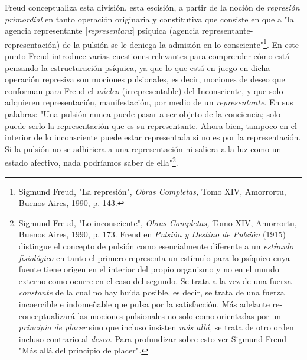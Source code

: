 Freud conceptualiza esta división, esta escisión, a partir de la noción
de \emph{represión primordial} en tanto operación originaria y
constitutiva que consiste en que a "la agencia representante
{[}\emph{representanz}{]} psíquica (agencia
representante-representación) de la pulsión se le deniega la admisión en
lo consciente"\footnote{Sigmund Freud, "La represión", \emph{Obras
  Completas,} Tomo XIV, Amorrortu, Buenos Aires, 1990, p. 143.}. En este
punto Freud introduce varias cuestiones relevantes para comprender cómo
está pensando la estructuración psíquica, ya que lo que está en juego en
dicha operación represiva son mociones pulsionales, es decir, mociones
de deseo que conforman para Freud el \emph{núcleo} (irrepresentable) del
Inconsciente, y que solo adquieren representación, manifestación, por
medio de un \emph{representante}. En sus palabras: "Una pulsión nunca
puede pasar a ser objeto de la conciencia; solo puede serlo la
representación que es su representante. Ahora bien, tampoco en el
interior de lo inconsciente puede estar representada si no es por la
representación. Si la pulsión no se adhiriera a una representación ni
saliera a la luz como un estado afectivo, nada podríamos saber de
ella"\footnote{Sigmund Freud, "Lo inconsciente", \emph{Obras Completas,}
  Tomo XIV, Amorrortu, Buenos Aires, 1990, p. 173. Freud en
  \emph{Pulsión y Destino de Pulsión} (1915) distingue el concepto de
  pulsión como esencialmente diferente a un \emph{estímulo fisiológico}
  en tanto el primero representa un estímulo para lo psíquico cuya
  fuente tiene origen en el interior del propio organismo y no en el
  mundo externo como ocurre en el caso del segundo. Se trata a la vez de
  una fuerza \emph{constante} de la cual no hay huída posible, es decir,
  se trata de una fuerza incoercible e indomeñable que pulsa por la
  satisfacción. Más adelante re-conceptualizará las mociones pulsionales
  no solo como orientadas por un \emph{principio de placer} sino que
  incluso insisten \emph{más allá,} se trata de otro orden incluso
  contrario al \emph{deseo}. Para profundizar sobre esto ver Sigmund
  Freud "Más allá del principio de placer"\emph{.}}.

